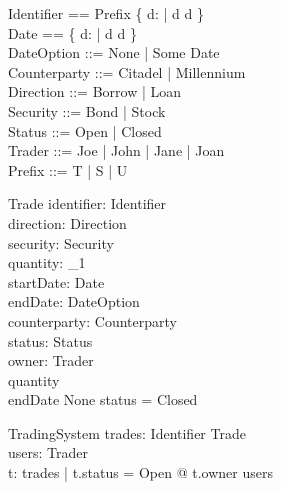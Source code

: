 \documentclass{article}
\begin{document}
\begin{zed}
Identifier == Prefix \cross \{ d: \nat | d  \land d  \} \\ 
Date == \{ d: \nat | d  \land d  \} \\
DateOption ::= None | Some \ldata Date \rdata \\
Counterparty ::= Citadel | Millennium  \\ 
Direction ::= Borrow | Loan \\
Security ::= Bond | Stock \\
Status ::= Open | Closed \\  
Trader ::= Joe | John | Jane | Joan \\
Prefix ::= T | S | U \\
\end{zed}
\vspace{-0.6cm} 
\begin{schema}{Trade}
identifier: Identifier \\
direction: Direction \\ 
security: Security \\
quantity: \nat_1 \\
startDate: Date \\
endDate: DateOption \\ 
counterparty: Counterparty \\
status: Status \\
owner: Trader \\
\where
quantity  \\
endDate \neq None \implies status = Closed \\
\end{schema}
\vspace{-0.6cm} 
\begin{schema}{TradingSystem}
trades: Identifier \pfun Trade \\
users: \finset Trader \\
\where
\forall t: \ran trades | t.status = Open @ t.owner \in users 
\end{schema}
\end{document}
